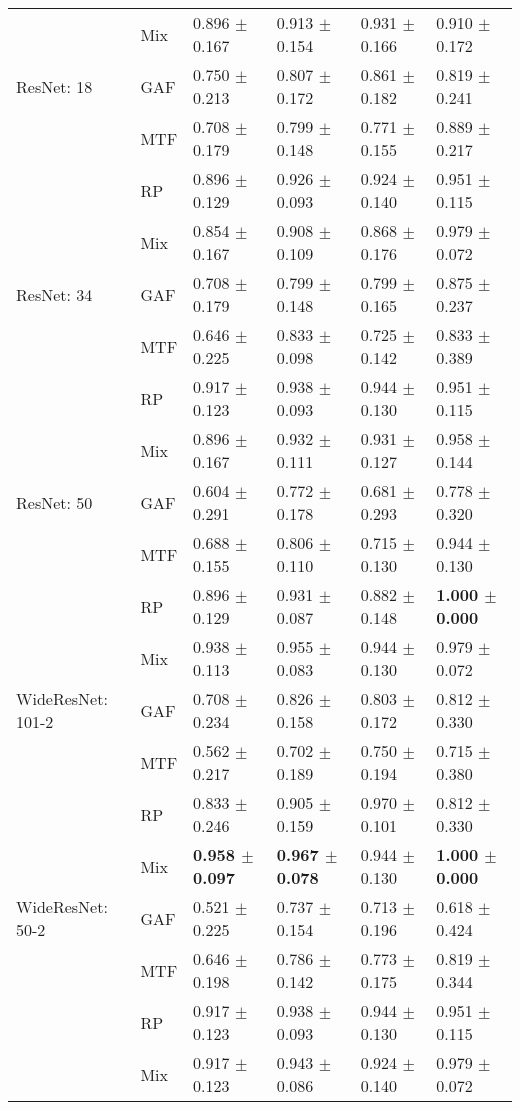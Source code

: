 \begin{longtable}[t]{llllll}
 & Mix & 0.896 $\pm$ 0.167 & 0.913 $\pm$ 0.154 & 0.931 $\pm$ 0.166 & 0.910 $\pm$ 0.172 \\
ResNet: 18 & GAF & 0.750 $\pm$ 0.213 & 0.807 $\pm$ 0.172 & 0.861 $\pm$ 0.182 & 0.819 $\pm$ 0.241 \\
 & MTF & 0.708 $\pm$ 0.179 & 0.799 $\pm$ 0.148 & 0.771 $\pm$ 0.155 & 0.889 $\pm$ 0.217 \\
 & RP & 0.896 $\pm$ 0.129 & 0.926 $\pm$ 0.093 & 0.924 $\pm$ 0.140 & 0.951 $\pm$ 0.115 \\
 & Mix & 0.854 $\pm$ 0.167 & 0.908 $\pm$ 0.109 & 0.868 $\pm$ 0.176 & 0.979 $\pm$ 0.072 \\
ResNet: 34 & GAF & 0.708 $\pm$ 0.179 & 0.799 $\pm$ 0.148 & 0.799 $\pm$ 0.165 & 0.875 $\pm$ 0.237 \\
 & MTF & 0.646 $\pm$ 0.225 & 0.833 $\pm$ 0.098 & 0.725 $\pm$ 0.142 & 0.833 $\pm$ 0.389 \\
 & RP & 0.917 $\pm$ 0.123 & 0.938 $\pm$ 0.093 & 0.944 $\pm$ 0.130 & 0.951 $\pm$ 0.115 \\
 & Mix & 0.896 $\pm$ 0.167 & 0.932 $\pm$ 0.111 & 0.931 $\pm$ 0.127 & 0.958 $\pm$ 0.144 \\
ResNet: 50 & GAF & 0.604 $\pm$ 0.291 & 0.772 $\pm$ 0.178 & 0.681 $\pm$ 0.293 & 0.778 $\pm$ 0.320 \\
 & MTF & 0.688 $\pm$ 0.155 & 0.806 $\pm$ 0.110 & 0.715 $\pm$ 0.130 & 0.944 $\pm$ 0.130 \\
 & RP & 0.896 $\pm$ 0.129 & 0.931 $\pm$ 0.087 & 0.882 $\pm$ 0.148 & \textbf{1.000 $\pm$ 0.000} \\
 & Mix & 0.938 $\pm$ 0.113 & 0.955 $\pm$ 0.083 & 0.944 $\pm$ 0.130 & 0.979 $\pm$ 0.072 \\
WideResNet: 101-2 & GAF & 0.708 $\pm$ 0.234 & 0.826 $\pm$ 0.158 & 0.803 $\pm$ 0.172 & 0.812 $\pm$ 0.330 \\
 & MTF & 0.562 $\pm$ 0.217 & 0.702 $\pm$ 0.189 & 0.750 $\pm$ 0.194 & 0.715 $\pm$ 0.380 \\
 & RP & 0.833 $\pm$ 0.246 & 0.905 $\pm$ 0.159 & 0.970 $\pm$ 0.101 & 0.812 $\pm$ 0.330 \\
 & Mix & \textbf{0.958 $\pm$ 0.097} & \textbf{0.967 $\pm$ 0.078} & 0.944 $\pm$ 0.130 & \textbf{1.000 $\pm$ 0.000} \\
WideResNet: 50-2 & GAF & 0.521 $\pm$ 0.225 & 0.737 $\pm$ 0.154 & 0.713 $\pm$ 0.196 & 0.618 $\pm$ 0.424 \\
 & MTF & 0.646 $\pm$ 0.198 & 0.786 $\pm$ 0.142 & 0.773 $\pm$ 0.175 & 0.819 $\pm$ 0.344 \\
 & RP & 0.917 $\pm$ 0.123 & 0.938 $\pm$ 0.093 & 0.944 $\pm$ 0.130 & 0.951 $\pm$ 0.115 \\
 & Mix & 0.917 $\pm$ 0.123 & 0.943 $\pm$ 0.086 & 0.924 $\pm$ 0.140 & 0.979 $\pm$ 0.072 \\
\end{longtable}
